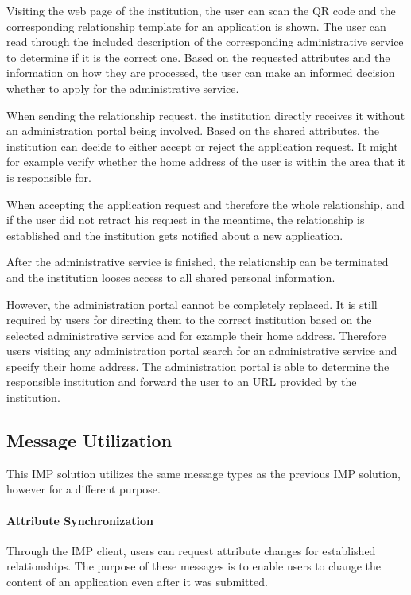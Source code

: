 Visiting the web page of the institution, the user can scan the QR code and the corresponding relationship template for an application is shown. The user can read through the included description of the corresponding administrative service to determine if it is the correct one. Based on the requested attributes and the information on how they are processed, the user can make an informed decision whether to apply for the administrative service.

When sending the relationship request, the institution directly receives it without an administration portal being involved. Based on the shared attributes, the institution can decide to either accept or reject the application request. It might for example verify whether the home address of the user is within the area that it is responsible for.

When accepting the application request and therefore the whole relationship, and if the user did not retract his request in the meantime, the relationship is established and the institution gets notified about a new application.

After the administrative service is finished, the relationship can be terminated and the institution looses access to all shared personal information.

However, the administration portal cannot be completely replaced. It is still required by users for directing them to the correct institution based on the selected administrative service and for example their home address. Therefore users visiting any administration portal search for an administrative service and specify their home address. The administration portal is able to determine the responsible institution and forward the user to an URL provided by the institution. 

\subsection{Message Utilization}

This IMP solution utilizes the same message types as the previous IMP solution, however for a different purpose.

\paragraph{Attribute Synchronization}

Through the IMP client, users can request attribute changes for established relationships. The purpose of these messages is to enable users to change the content of an application even after it was submitted.

